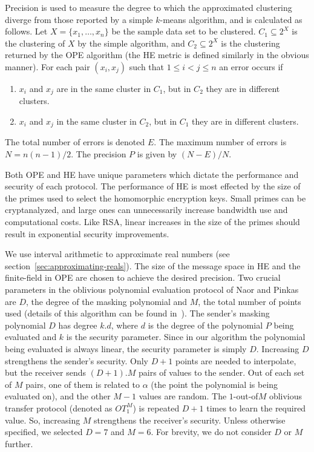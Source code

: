 Precision is used to measure the degree to which the approximated
clustering diverge from those reported by a simple $k$-means
algorithm, and is calculated as follows.  Let $X = \{x_1, \dots,
x_n\}$ be the sample data set to be clustered.  $C_1 \subseteq 2^X$ is
the clustering of $X$ by the simple algorithm, and $C_2 \subseteq 2^X$
is the clustering returned by the OPE algorithm (the HE metric is
defined similarly in the obvious manner).  For each pair $(x_i,x_j)$
such that $1 \leq i < j \leq n$ an error occurs if

\vspace{-4pt}

\itembase
\begin{enumerate}
\itembase
\item 
$x_i$ and $x_j$ are in the same cluster in $C_1$, but in $C_2$
they are in different clusters.

\item
$x_i$ and $x_j$ in the same cluster in $C_2$, but in $C_1$
they are in different clusters.
\end{enumerate}

\vspace{-4pt}

\noindent
The total number of errors is denoted $E$.  The maximum number of
errors is $N = n(n-1)/2$.  The precision $P$ is given by $(N-E)/N$.

Both OPE and HE have unique parameters which dictate the performance
and security of each protocol.  The performance of HE is most
effected by the size of the primes used to select the homomorphic
encryption keys.  Small primes can be cryptanalyzed, and large ones
can unnecessarily increase bandwidth use and computational costs.
Like RSA, linear increases in the size of the primes should result in
exponential security improvements.

We use interval arithmetic to approximate real numbers (see
section~\ref{sec:approximating-reals}).  The size of the message space in
HE and the finite-field in OPE are chosen to achieve the desired
precision.  Two crucial parameters in the
oblivious polynomial evaluation protocol of Naor and Pinkas are $D$,
the degree of the masking polynomial and $M$, the total number of
points used (details of this algorithm can be found
in~\cite{NaorPinkas99}). The sender's masking polynomial $D$ has
degree $k .  d$, where $d$ is the degree of the polynomial $P$
being evaluated and $k$ is the security parameter.  Since in our
algorithm the polynomial being evaluated is always linear, the
security parameter is simply $D$.  Increasing $D$ strengthens the
sender's security.  Only $D+1$ points are needed to interpolate, but
the receiver sends $(D+1) . M$ pairs of values to the sender.  Out
of each set of $M$ pairs, one of them is related to $\alpha$ (the
point the polynomial is being evaluated on), and the other $M-1$
values are random.  The $1$-out-of$M$ oblivious transfer protocol
(denoted as $OT_1^M$) is repeated $D+1$ times to learn the required
value.  So, increasing $M$ strengthens the receiver's security.
Unless otherwise specified, we selected $D=7$ and $M=6$.  For brevity,
we do not consider $D$ or $M$ further.

